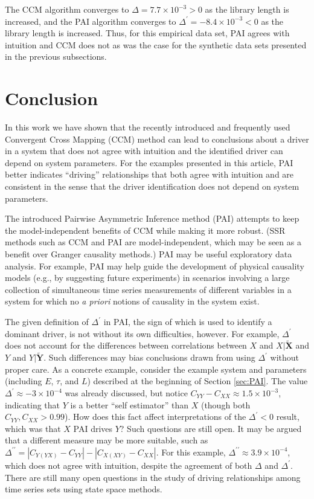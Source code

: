 \documentclass[twocolumn,aps,pre,groupedaddress]{revtex4-1}
\begin{document}
The CCM algorithm converges to $\Delta = 7.7\times10^{-3} > 0$ as the library length is increased, and the PAI algorithm converges to $\Delta^\prime = -8.4\times10^{-3} < 0$ as the library length is increased.  Thus, for this empirical data set, PAI agrees with intuition and CCM does not as was the case for the synthetic data sets presented in the previous subsections.

\section{Conclusion}
In this work we have shown that the recently introduced and frequently used Convergent Cross Mapping (CCM) method can lead to conclusions about a driver in a system that does not agree with intuition and the identified driver can depend on system parameters.  For the examples presented in this article, PAI better indicates ``driving'' relationships that both agree with intuition and are consistent in the sense that the driver identification does not depend on system parameters.  

The introduced Pairwise Asymmetric Inference method (PAI) attempts to keep the model-independent benefits of CCM while making it more robust. (SSR methods such as CCM and PAI are model-independent, which may be seen as a benefit over Granger causality methods.) PAI may be useful exploratory data analysis.  For example, PAI may help guide the development of physical causality models (e.g., by suggesting future experiments) in scenarios involving a large collection of simultaneous time series measurements of different variables in a system for which no {\em a priori} notions of causality in the system exist. 

The given definition of $\Delta^\prime$ in PAI, the sign of which is used to identify a dominant driver, is not without its own difficulties, however.  For example, $\Delta^\prime$ does not account for the differences between correlations between $X$ and $X|\tilde{\mathbf{X}}$ and $Y$ and $Y|\tilde{\mathbf{Y}}$.  Such differences may bias conclusions drawn from using $\Delta^\prime$ without proper care.  As a concrete example, consider the example system and parameters (including $E$, $\tau$, and $L$) described at the beginning of Section \ref{sec:PAI}.  The value $\Delta^\prime \approx -3\times 10^{-4}$ was already discussed, but notice $C_{YY}-C_{XX} \approx 1.5\times10^{-3}$, indicating that $Y$ is a better ``self estimator'' than $X$ (though both $C_{YY},C_{XX}>0.99$).  How does this fact affect interpretations of the $\Delta^\prime<0$ result, which was that $X$ PAI drives $Y$?  Such questions are still open.  It may be argued that a different measure may be more suitable, such as $\Delta^{\prime\prime} = |C_{Y(YX)}-C_{YY}|-|C_{X(XY)}-C_{XX}|$.  For this example, $\Delta^{\prime\prime} \approx 3.9\times 10^{-4}$, which does not agree with intuition, despite the agreement of both $\Delta$ and $\Delta^\prime$.  There are still many open questions in the study of driving relationships among time series sets using state space methods.
\end{document}
